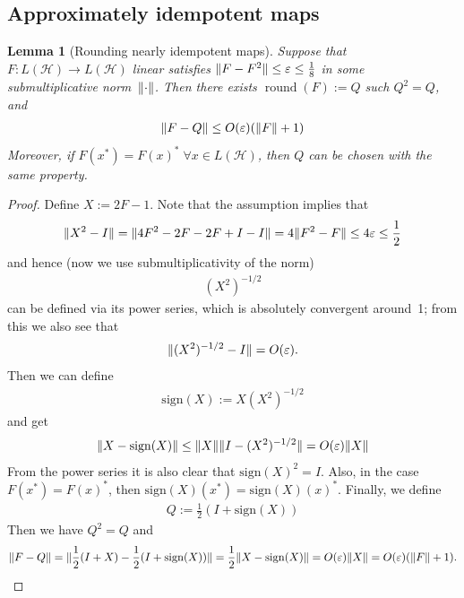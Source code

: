 \documentclass[11pt,reqno]{amsart}
\newtheorem{lemma}[theorem]{Lemma}
\theoremstyle{definition}
\theoremstyle{remark}
\numberwithin{equation}{section}
\DeclareMathOperator{\round}{round}
\newcommand{\eps}{\varepsilon}
\newcommand{\cH}{\mathcal H}
\DeclarePairedDelimiter\norm{\lVert}{\rVert}
\begin{document}
\subsection{Approximately idempotent maps}

\begin{lemma}[Rounding nearly idempotent maps]\label{lemma:round}
    Suppose that $F : L(\cH) \to L(\cH)$ linear satisfies $\norm{F - F^2} \leq \eps \leq \frac18$ in some submultiplicative norm~$\norm{\cdot}$.
    Then there exists $\round(F) := Q$ such $Q^2 = Q$, and
    \begin{align*}
        \norm{F - Q} \leq O(\eps) (\norm{F} + 1)
    \end{align*}
    Moreover, if $F(x^*)=F(x)^* \; \forall x \in  L(\cH)$, then $Q$ can be chosen with the same property.
\end{lemma}
\begin{proof}
    Define $X := 2F-1$.
    Note that the assumption implies that
    \begin{align*}
        \norm{X^2 - I}
        = \norm{4F^2 - 2F - 2F + I - I}
        = 4 \norm{F^2 - F}
        \leq 4\eps \leq \frac12
    \end{align*}
    and hence (now we use submultiplicativity of the norm)
    \begin{align*}
        (X^2)^{-1/2}
    \end{align*}
    can be defined via its power series, which is absolutely convergent around~1; from this we also see that
    \begin{align*}
        \norm{(X^2)^{-1/2} - I } = O(\eps).
    \end{align*}
    Then we can define
    \begin{align*}
        \mathrm{sign}(X) := X (X^2)^{-1/2}
    \end{align*}
    and get
    \begin{align*}
        \norm{X - \mathrm{sign}(X)} \leq \norm X \norm{I - (X^2)^{-1/2}} = O(\eps) \norm X
    \end{align*}
    From the power series it is also clear that $\mathrm{sign}(X)^2 = I$.  Also, in the case $F(x^*)=F(x)^*$, then  $\mathrm{sign}(X)(x^*)=\mathrm{sign}(X)(x)^*$.
    Finally, we define
    \begin{align*}
        Q := \frac12 (I + \mathrm{sign}(X))
    \end{align*}
    Then we have $Q^2 = Q$ and
    \begin{align*}
        \norm{F - Q}
        = \norm{\frac12 (I + X) - \frac12 (I + \mathrm{sign}(X))}
        = \frac12 \norm{X - \mathrm{sign}(X)}
        = O(\eps)\norm{X}
        = O(\eps) (\norm{F} + 1).
    \end{align*}
\end{proof}
\end{document}
